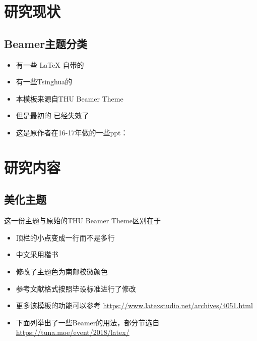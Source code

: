\documentclass[10pt,aspectratio=43]{beamer}
\begin{document}
\section{研究现状}

\subsection{Beamer主题分类}

\begin{frame}
    \begin{itemize}
        \item 有一些 \LaTeX{} 自带的
        \item 有一些Tsinghua的
        \item 本模板来源自THU Beamer Theme
        \item 但是最初的 \href{http://far.tooold.cn/post/latex/beamertsinghua}{\color{purple}{link}} \cite{origin}已经失效了
        \item 这是原作者在16-17年做的一些ppt：\href{https://github.com/Trinkle23897/oi_slides}{\color{blue}{戳我}}
    \end{itemize}
\end{frame}


\section{研究内容}

\subsection{美化主题}

\begin{frame}{这一份主题与原始的THU Beamer Theme区别在于}
    \begin{itemize}
        \item 顶栏的小点变成一行而不是多行
        \item 中文采用楷书
        \item 修改了主题色为南邮校徽颜色
        \item 参考文献格式按照毕设标准进行了修改
        \item 更多该模板的功能可以参考 \url{https://www.latexstudio.net/archives/4051.html}
        \item 下面列举出了一些Beamer的用法，部分节选自 \url{https://tuna.moe/event/2018/latex/}
    \end{itemize}
\end{frame}
\end{document}
